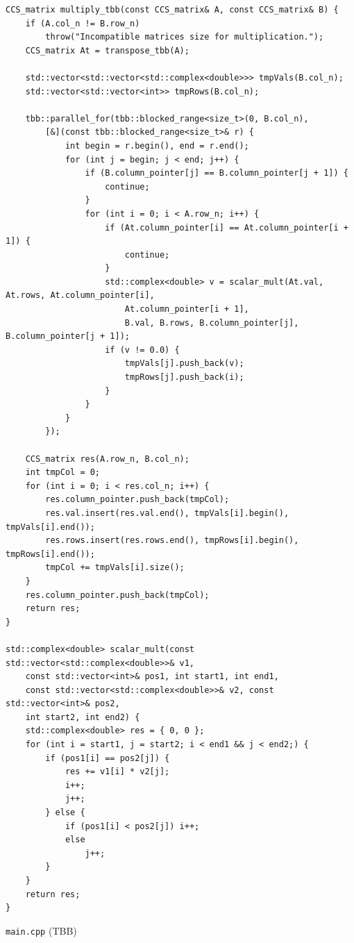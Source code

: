 \documentclass{report}
\begin{document}
\begin{lstlisting}
CCS_matrix multiply_tbb(const CCS_matrix& A, const CCS_matrix& B) {
    if (A.col_n != B.row_n)
        throw("Incompatible matrices size for multiplication.");
    CCS_matrix At = transpose_tbb(A);

    std::vector<std::vector<std::complex<double>>> tmpVals(B.col_n);
    std::vector<std::vector<int>> tmpRows(B.col_n);

    tbb::parallel_for(tbb::blocked_range<size_t>(0, B.col_n),
        [&](const tbb::blocked_range<size_t>& r) {
            int begin = r.begin(), end = r.end();
            for (int j = begin; j < end; j++) {
                if (B.column_pointer[j] == B.column_pointer[j + 1]) {
                    continue;
                }
                for (int i = 0; i < A.row_n; i++) {
                    if (At.column_pointer[i] == At.column_pointer[i + 1]) {
                        continue;
                    }
                    std::complex<double> v = scalar_mult(At.val, At.rows, At.column_pointer[i],
                        At.column_pointer[i + 1],
                        B.val, B.rows, B.column_pointer[j], B.column_pointer[j + 1]);
                    if (v != 0.0) {
                        tmpVals[j].push_back(v);
                        tmpRows[j].push_back(i);
                    }
                }
            }
        });

    CCS_matrix res(A.row_n, B.col_n);
    int tmpCol = 0;
    for (int i = 0; i < res.col_n; i++) {
        res.column_pointer.push_back(tmpCol);
        res.val.insert(res.val.end(), tmpVals[i].begin(), tmpVals[i].end());
        res.rows.insert(res.rows.end(), tmpRows[i].begin(), tmpRows[i].end());
        tmpCol += tmpVals[i].size();
    }
    res.column_pointer.push_back(tmpCol);
    return res;
}

std::complex<double> scalar_mult(const std::vector<std::complex<double>>& v1,
    const std::vector<int>& pos1, int start1, int end1,
    const std::vector<std::complex<double>>& v2, const std::vector<int>& pos2,
    int start2, int end2) {
    std::complex<double> res = { 0, 0 };
    for (int i = start1, j = start2; i < end1 && j < end2;) {
        if (pos1[i] == pos2[j]) {
            res += v1[i] * v2[j];
            i++;
            j++;
        } else {
            if (pos1[i] < pos2[j]) i++;
            else
                j++;
        }
    }
    return res;
}

\end{lstlisting}
\verb|main.cpp| (TBB)
\end{document}

